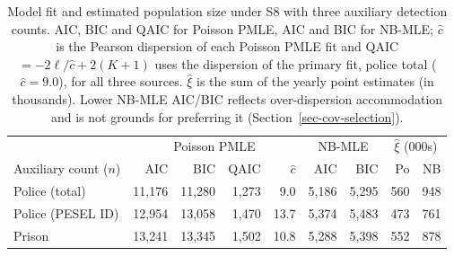 \begin{table}[H]
\centering
\caption{\label{tbl-nsource-fit}Model fit and estimated population size under S8 with three auxiliary detection counts. AIC, BIC and QAIC for Poisson PMLE, AIC and BIC for NB-MLE; $\hat c$ is the Pearson dispersion of each Poisson PMLE fit and QAIC $= -2\ell/\hat c + 2(K+1)$ uses the dispersion of the primary fit, police total ($\hat c = 9.0$), for all three sources. $\hat\xi$ is the sum of the yearly point estimates (in thousands). Lower NB-MLE AIC/BIC reflects over-dispersion accommodation and is not grounds for preferring it (Section~\ref{sec-cov-selection}).}
\begin{tabular}{lrrrrrr|rr} \toprule
& \multicolumn{4}{c}{Poisson PMLE} & \multicolumn{2}{c|}{NB-MLE} & \multicolumn{2}{c}{$\hat\xi$ (000s)} \\
Auxiliary count ($n$) & AIC & BIC & QAIC & $\hat c$ & AIC & BIC & Po & NB \\ \midrule
Police (total) & 11,176 & 11,280 & 1,273 & 9.0 & 5,186 & 5,295 & 560 & 948 \\
Police (PESEL ID) & 12,954 & 13,058 & 1,470 & 13.7 & 5,374 & 5,483 & 473 & 761 \\
Prison & 13,241 & 13,345 & 1,502 & 10.8 & 5,288 & 5,398 & 552 & 878 \\
\bottomrule
\end{tabular}
\end{table}
